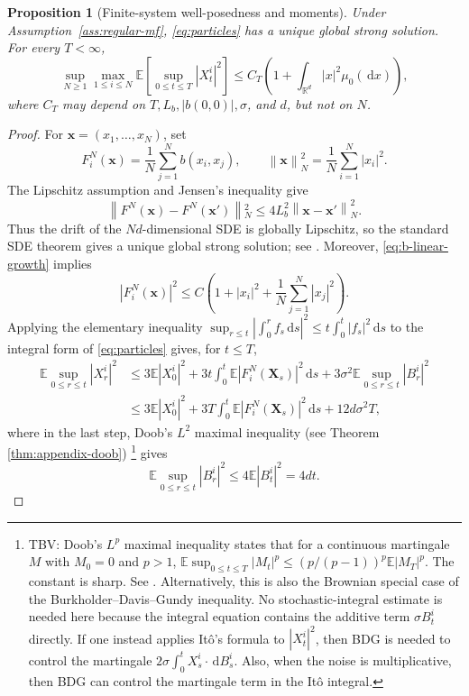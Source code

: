 \documentclass[11pt]{amsart}
\numberwithin{equation}{section}
\theoremstyle{plain}
\newtheorem{proposition}[theorem]{Proposition}
\newcommand{\R}{\mathbb{R}}
\newcommand{\E}{\mathbb{E}}
\newcommand{\dd}{\,\mathrm{d}}
\newcommand{\abs}[1]{\left\lvert#1\right\rvert}
\newcommand{\norm}[1]{\left\lVert#1\right\rVert}
\begin{document}
\begin{proposition}[Finite-system well-posedness and moments]
\label{prop:finite-wp}
Under Assumption~\ref{ass:regular-mf}, \eqref{eq:particles} has a unique global
strong solution.  For every $T<\infty$,
\begin{equation}\label{eq:finite-moment}
  \sup_{N\geq1}\max_{1\leq i\leq N}
  \E\left[\sup_{0\leq t\leq T}\abs{X_t^i}^2\right]
  \leq C_T\left(1+\int_{\R^d}\abs{x}^2\mu_0(\dd x)\right),
\end{equation}
where $C_T$ may depend on $T,L_b,\abs{b(0,0)},\sigma$, and $d$, but not on
$N$.
\end{proposition}
\begin{proof}
For $\boldsymbol{x}=(x_1,\ldots,x_N)$, set
\[
 F_i^N(\boldsymbol{x})=\frac1N\sum_{j=1}^N b(x_i,x_j),
 \qquad
 \norm{\boldsymbol{x}}_N^2=\frac1N\sum_{i=1}^N\abs{x_i}^2.
\]
The Lipschitz assumption and Jensen's inequality give
\[
 \norm{F^N(\boldsymbol{x})-F^N(\boldsymbol{x}')}{}_N^2
 \leq 4L_b^2\norm{\boldsymbol{x}-\boldsymbol{x}'}_N^2.
\]
Thus the drift of the $Nd$-dimensional SDE is globally Lipschitz, so the
standard SDE theorem gives a unique global strong solution; see
\cite[Chapter~5]{KaratzasShreve1991}.  Moreover,
\eqref{eq:b-linear-growth} implies
\[
 \abs{F_i^N(\boldsymbol{x})}^2
 \leq C\left(1+\abs{x_i}^2+\frac1N\sum_{j=1}^N\abs{x_j}^2\right).
\]
Applying the elementary inequality
$\sup_{r\leq t}\abs{\int_0^r f_s\dd s}^2
\leq t\int_0^t\abs{f_s}^2\dd s$ to the integral form of
\eqref{eq:particles} gives, for $t\leq T$,
\begin{align*}
 \E\sup_{0\leq r\leq t}\abs{X_r^i}^2
 &\leq 3\E\abs{X_0^i}^2
 +3t\int_0^t\E\abs{F_i^N(\boldsymbol X_s)}^2\dd s
 +3\sigma^2\E\sup_{0\leq r\leq t}\abs{B_r^i}^2\\
 &\leq 3\E\abs{X_0^i}^2
 +3T\int_0^t\E\abs{F_i^N(\boldsymbol X_s)}^2\dd s
 +12d\sigma^2T, 
\end{align*}
where in the last step, Doob's $L^2$ maximal inequality (see Theorem \ref{thm:appendix-doob})
\footnote{TBV: Doob's $L^p$ maximal inequality states that for a continuous martingale $M$ with $M_0=0$ and $p>1$, $\E\sup_{0\leq t\leq T}\abs{M_t}^p\leq (p/(p-1))^p\E\abs{M_T}^p$.  The constant is sharp.  See \cite[Theorem~3.2]{KaratzasShreve1991}. Alternatively,  this is also the Brownian special case of the Burkholder--Davis--Gundy
inequality.  No stochastic-integral estimate is needed here because the
integral equation contains the additive term $\sigma B_t^i$ directly.  If one instead applies It\^o's formula to $\abs{X_t^i}^2$, then BDG is needed to control the martingale $2\sigma\int_0^t X_s^i\cdot\dd B_s^i$. Also, when the noise is multiplicative, then BDG can control the martingale term in the It\^o integral. }
gives
\[
 \E\sup_{0\leq r\leq t}\abs{B_r^i}^2
 \leq 4\E\abs{B_t^i}^2=4dt.
\] 


\end{proof}
\end{document}
